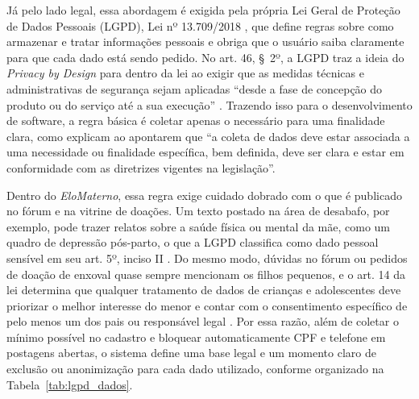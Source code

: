 Já pelo lado legal, essa abordagem é exigida pela própria Lei Geral de Proteção de Dados Pessoais (LGPD), Lei nº 13.709/2018 \cite{brasil2018}, que define regras sobre como armazenar e tratar informações pessoais e obriga que o usuário saiba claramente para que cada dado está sendo pedido. No art. 46, \S~2º, a LGPD traz a ideia do \textit{Privacy by Design} para dentro da lei ao exigir que as medidas técnicas e administrativas de segurança sejam aplicadas ``desde a fase de concepção do produto ou do serviço até a sua execução'' \cite{brasil2018}. Trazendo isso para o desenvolvimento de software, a regra básica é coletar apenas o necessário para uma finalidade clara, como explicam \textcite[4]{moura2024} ao apontarem que ``a coleta de dados deve estar associada a uma necessidade ou finalidade específica, bem definida, deve ser clara e estar em conformidade com as diretrizes vigentes na legislação''.

Dentro do \textit{EloMaterno}, essa regra exige cuidado dobrado com o que é publicado no fórum e na vitrine de doações. Um texto postado na área de desabafo, por exemplo, pode trazer relatos sobre a saúde física ou mental da mãe, como um quadro de depressão pós-parto, o que a LGPD classifica como dado pessoal sensível em seu art. 5º, inciso II \cite{brasil2018}. Do mesmo modo, dúvidas no fórum ou pedidos de doação de enxoval quase sempre mencionam os filhos pequenos, e o art. 14 da lei determina que qualquer tratamento de dados de crianças e adolescentes deve priorizar o melhor interesse do menor e contar com o consentimento específico de pelo menos um dos pais ou responsável legal \cite{brasil2018}. Por essa razão, além de coletar o mínimo possível no cadastro e bloquear automaticamente CPF e telefone em postagens abertas, o sistema define uma base legal e um momento claro de exclusão ou anonimização para cada dado utilizado, conforme organizado na Tabela~\ref{tab:lgpd_dados}.

